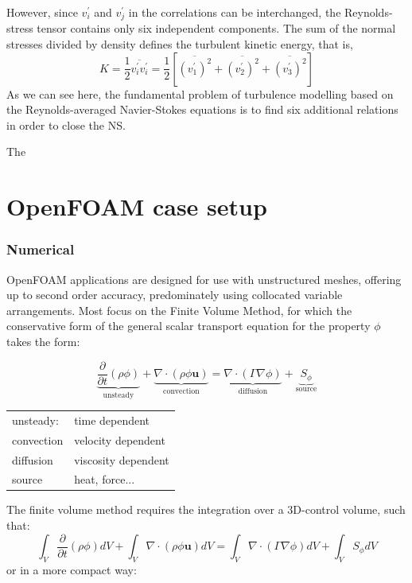 \documentclass{article}
\begin{document}
However, since $v_i ^\prime$ and $v_j ^\prime$ in the correlations can be interchanged, the Reynolds-stress 
tensor contains only six independent components. The sum of the normal stresses divided by density defines the turbulent kinetic energy, that is,
\begin{equation}
K = \frac{1}{2} \overline{v_i ^\prime v_i ^\prime	} = \frac{1}{2}\left[ \overline{(v_1 ^\prime)^2} + \overline{(v_2 ^\prime)^2} + \overline{(v_3 ^\prime)^2}  \right]
\end{equation}
As we can see here, the fundamental problem of turbulence modelling based on the Reynolds-averaged Navier-Stokes equations is to find six additional relations in order to close the NS.

The 


\part{OpenFOAM case setup}

\section{Numerical}
OpenFOAM applications are designed for use with unstructured meshes, offering up to second order accuracy, predominately using collocated variable arrangements. Most focus on the Finite Volume Method, for which the conservative form of the general scalar transport equation for the property $\phi$ takes the form:

\begin{equation}
\underbrace{\frac{\partial}{\partial t} (\rho\phi)}_{\mathrm{unsteady}} + \underbrace{\nabla \cdot (\rho \phi \textbf{u})}_{\mathrm{convection}} = \underbrace{\nabla \cdot (\Gamma \nabla \phi)}_{\mathrm{diffusion}} + \underbrace{S_{\phi}}_{\mathrm{source}}
\label{eq:transport equation}
\end{equation}


\begin{table}[hbp!]
\begin{tabular}{l l}
	unsteady: &   time dependent\\
	convection & velocity dependent\\
	diffusion & viscosity dependent \\
	source & heat, force...
\end{tabular}
\end{table}
The finite volume method requires the integration over a 3D-control volume, such that:
\begin{equation}
\int_V \frac{\partial}{\partial t} {(\rho \phi)} dV + \int_V \nabla \cdot \left(\rho \phi \textbf{u} \right) dV = \int_V \nabla \cdot \left(\Gamma \nabla \phi \right) dV + \int_V S_\phi dV 
\label{eq:intergal transport equation}
\end{equation}
or in a more compact way:
\end{document}
